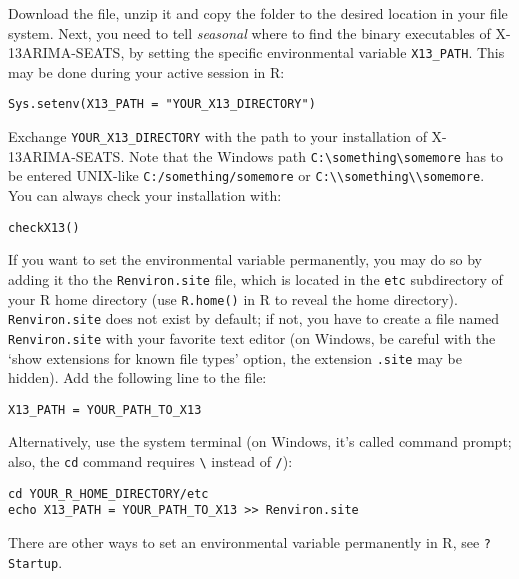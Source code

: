 Download the file, unzip it and copy the folder to the desired location
in your file system. Next, you need to tell \emph{seasonal} where to
find the binary executables of X-13ARIMA-SEATS, by setting the specific
environmental variable \texttt{X13\_PATH}. This may be done during your
active session in R:

\begin{verbatim}
Sys.setenv(X13_PATH = "YOUR_X13_DIRECTORY")
\end{verbatim}

Exchange \texttt{YOUR\_X13\_DIRECTORY} with the path to your
installation of X-13ARIMA-SEATS. Note that the Windows path
\texttt{C:\textbackslash{}something\textbackslash{}somemore} has to be
entered UNIX-like \texttt{C:/something/somemore} or
\texttt{C:\textbackslash{}\textbackslash{}something\textbackslash{}\textbackslash{}somemore}.
You can always check your installation with:

\begin{verbatim}
checkX13()
\end{verbatim}

If you want to set the environmental variable permanently, you may do so
by adding it tho the \texttt{Renviron.site} file, which is located in
the \texttt{etc} subdirectory of your R home directory (use
\texttt{R.home()} in R to reveal the home directory).
\texttt{Renviron.site} does not exist by default; if not, you have to
create a file named \texttt{Renviron.site} with your favorite text
editor (on Windows, be careful with the `show extensions for known file
types' option, the extension \texttt{.site} may be hidden). Add the
following line to the file:

\begin{verbatim}
X13_PATH = YOUR_PATH_TO_X13
\end{verbatim}

Alternatively, use the system terminal (on Windows, it's called command
prompt; also, the \texttt{cd} command requires \texttt{\textbackslash{}}
instead of \texttt{/}):

\begin{verbatim}
cd YOUR_R_HOME_DIRECTORY/etc
echo X13_PATH = YOUR_PATH_TO_X13 >> Renviron.site
\end{verbatim}

There are other ways to set an environmental variable permanently in R,
see \texttt{?Startup}.


